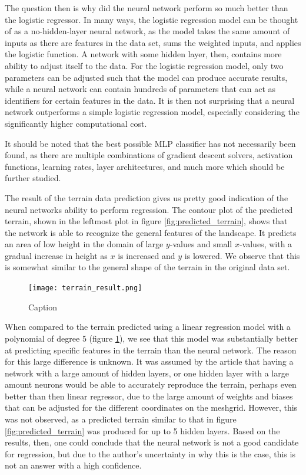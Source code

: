 \documentclass[a4paper,10pt,english]{article}
\begin{document}
The question then is why did the neural network perform so much better than the logistic regressor. In many ways, the logistic regression model can be thought of as a no-hidden-layer neural network, as the model takes the same amount of inputs as there are features in the data set, sums the weighted inputs, and applies the logistic function. A network with some hidden layer, then, contains more ability to adjust itself to the data. For the logistic regression model, only two parameters can be adjusted such that the model can produce accurate results, while a neural network can contain hundreds of parameters that can act as identifiers for certain features in the data. It is then not surprising that a neural network outperforms a simple logistic regression model, especially considering the significantly higher computational cost. 

It should be noted that the best possible MLP classifier has not necessarily been found, as there are multiple combinations of gradient descent solvers, activation functions, learning rates, layer architectures, and much more which should be further studied.

The result of the terrain data prediction gives us pretty good indication of the neural networks ability to perform regression. The contour plot of the predicted terrain, shown in the leftmost plot in figure \ref{fig:predicted_terrain}, shows that the network is able to recognize the general features of the landscape. It predicts an area of low height in the domain of large $y$-values and small $x$-values, with a gradual increase in height as $x$ is increased and $y$ is lowered. We observe that this is somewhat similar to the general shape of the terrain in the original data set. 

\begin{figure}
    \centering
    \texttt{[image: terrain\_result.png]}
    \caption{Caption}
    \label{fig:linreg_terrain}
\end{figure}

When compared to the terrain predicted using a linear regression model with a polynomial of degree 5 (figure \ref{fig:linreg_terrain}), we see that this model was substantially better at predicting specific features in the terrain than the neural network. The reason for this large difference is unknown. It was assumed by the article that having a network with a large amount of hidden layers, or one hidden layer with a large amount neurons would be able to accurately reproduce the terrain, perhaps even better than then linear regressor, due to the large amount of weights and biases that can be adjusted for the different coordinates on the meshgrid. However, this was not observed, as a predicted terrain similar to that in figure \ref{fig:predicted_terrain} was produced for up to 5 hidden layers. Based on the results, then, one could conclude that the neural network is not a good candidate for regression, but due to the author's uncertainty in why this is the case, this is not an answer with a high confidence.
\end{document}
